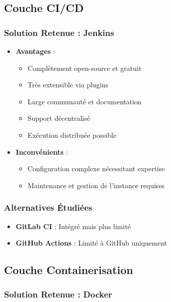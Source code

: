 \documentclass[12pt,a4paper]{report}
\begin{document}
\subsection{Couche CI/CD}

\subsubsection{Solution Retenue : Jenkins}

\begin{itemize}
    \item \textbf{Avantages} :
    \begin{itemize}
        \item Complètement open-source et gratuit
        \item Très extensible via plugins
        \item Large communauté et documentation
        \item Support décentralisé
        \item Exécution distribuée possible
    \end{itemize}
    \item \textbf{Inconvénients} :
    \begin{itemize}
        \item Configuration complexe nécessitant expertise
        \item Maintenance et gestion de l'instance requises
    \end{itemize}
\end{itemize}

\subsubsection{Alternatives Étudiées}

\begin{itemize}
    \item \textbf{GitLab CI} : Intégré mais plus limité
    \item \textbf{GitHub Actions} : Limité à GitHub uniquement
\end{itemize}

\subsection{Couche Containerisation}

\subsubsection{Solution Retenue : Docker}
\end{document}
